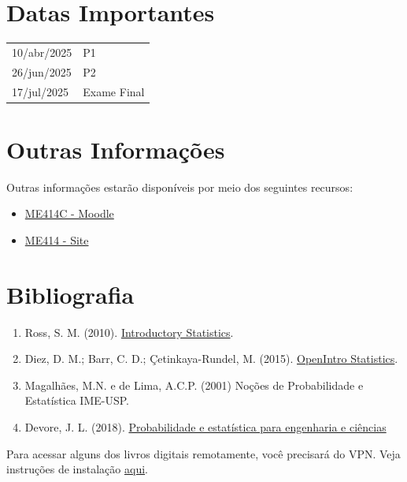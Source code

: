 \documentclass[paper=letter, fontsize=12pt]{scrartcl} %
\begin{document}
\section{Datas Importantes}

\begin{tabular}{ll}
10/abr/2025  & P1 \\
26/jun/2025 & P2 \\
17/jul/2025 & Exame Final
\end{tabular}

\section{Outras Informações}

Outras informações estarão disponíveis por meio dos seguintes recursos:

\begin{itemize}
\item \href{https://moodle.ggte.unicamp.br/course/view.php?id=21221}{{\color{blue} ME414C - Moodle}}
\item \href{https://me414-unicamp.github.io}{{\color{blue} ME414 - Site}}
\end{itemize}

\section{Bibliografia}
\begin{enumerate}
\item Ross, S. M. (2010). \href{http://www.sciencedirect.com/science/book/9780123743886}{Introductory Statistics}.
\item Diez, D. M.; Barr, C. D.; Çetinkaya-Rundel, M. (2015). \href{https://leanpub.com/openintro-statistics}{OpenIntro Statistics}.
\item Magalhães, M.N. e de Lima, A.C.P. (2001) Noções de Probabilidade e Estatística IME-USP.
\item Devore, J. L. (2018). \href{http://acervus.unicamp.br/index.asp?codigo_sophia=1138563}{Probabilidade e estatística para engenharia e ciências}
\end{enumerate}


Para acessar alguns dos livros digitais remotamente, você precisará do VPN. Veja instruções de instalação \href{http://www.ccuec.unicamp.br/ccuec/acesso_remoto_vpn}{{\color{blue} aqui}}.
\end{document}
